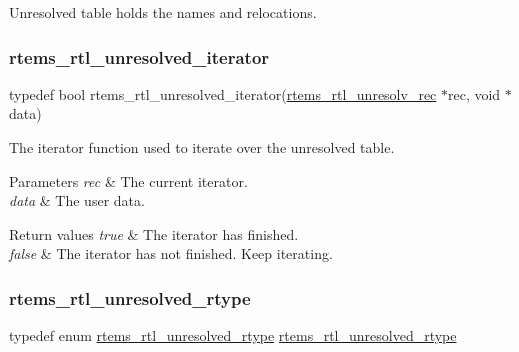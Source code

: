 Unresolved table holds the names and relocations. \mbox{\label{rtl-unresolved_8h_ab256ab6d71a66bca9ea2f63a86026c9d}} 
\subsubsection{\texorpdfstring{rtems\_rtl\_unresolved\_iterator}{rtems\_rtl\_unresolved\_iterator}}
{\footnotesize\ttfamily typedef bool rtems\+\_\+rtl\+\_\+unresolved\+\_\+iterator(\mbox{\hyperlink{structrtems__rtl__unresolv__rec}{rtems\+\_\+rtl\+\_\+unresolv\+\_\+rec}} $\ast$rec, void $\ast$data)}

The iterator function used to iterate over the unresolved table.


\begin{DoxyParams}{Parameters}
{\em rec} & The current iterator. \\
\hline
{\em data} & The user data. \\
\hline
\end{DoxyParams}

\begin{DoxyRetVals}{Return values}
{\em true} & The iterator has finished. \\
\hline
{\em false} & The iterator has not finished. Keep iterating. \\
\hline
\end{DoxyRetVals}
\mbox{\label{rtl-unresolved_8h_add0e4e38190bd032bad41b80139ed2b1}} 
\subsubsection{\texorpdfstring{rtems\_rtl\_unresolved\_rtype}{rtems\_rtl\_unresolved\_rtype}}
{\footnotesize\ttfamily typedef enum \mbox{\hyperlink{rtl-unresolved_8h_a4c5be38f1158006e6bc839d4f060ecb6}{rtems\+\_\+rtl\+\_\+unresolved\+\_\+rtype}}  \mbox{\hyperlink{rtl-unresolved_8h_a4c5be38f1158006e6bc839d4f060ecb6}{rtems\+\_\+rtl\+\_\+unresolved\+\_\+rtype}}}

